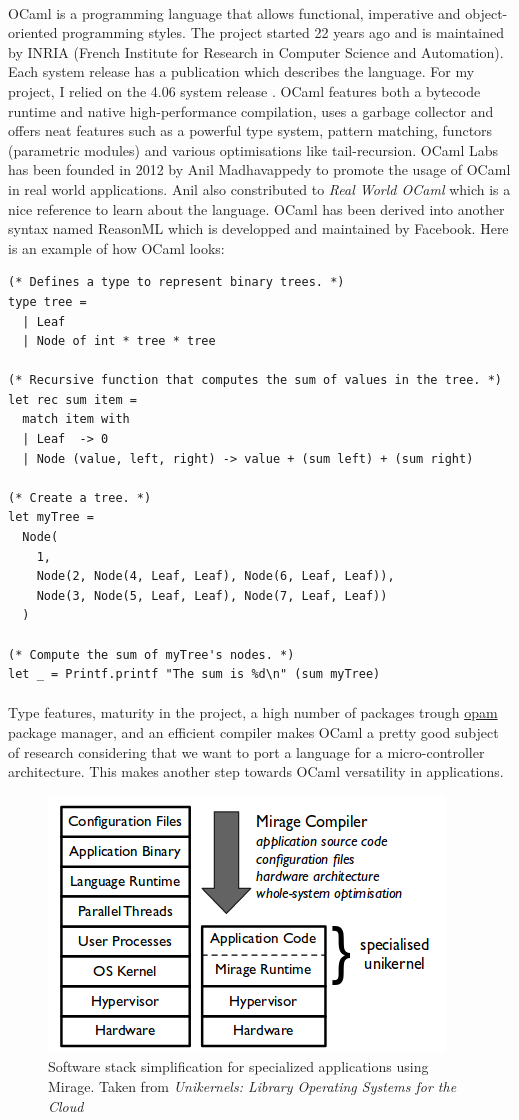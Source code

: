 \documentclass[a4paper]{article}
\begin{document}
\paragraph{}
OCaml is a programming language that allows functional, imperative and object-oriented programming styles. The project started 22 years ago and is maintained by 
INRIA (French Institute for Research in Computer Science and Automation). Each system release has a publication which describes the language. For my project, I 
relied on the 4.06 system release \cite{leroy2017ocaml}. OCaml features both a bytecode runtime and native high-performance compilation, uses a garbage 
collector and offers neat features such as a powerful type system, pattern matching, functors (parametric modules) and various optimisations like tail-recursion. 
OCaml Labs has been founded in 2012 by Anil Madhavappedy to promote the usage of OCaml in real world applications. Anil also constributed to \textit{Real World OCaml} 
\cite{minsky2013real} which is a nice reference to learn about the language. OCaml has been derived into another syntax named ReasonML which is developped and 
maintained by Facebook. Here is an example of how OCaml looks:
\begin{verbatim}
(* Defines a type to represent binary trees. *)
type tree =
  | Leaf
  | Node of int * tree * tree
 
(* Recursive function that computes the sum of values in the tree. *)
let rec sum item =
  match item with
  | Leaf  -> 0
  | Node (value, left, right) -> value + (sum left) + (sum right)
  
(* Create a tree. *)
let myTree =
  Node(
    1,
    Node(2, Node(4, Leaf, Leaf), Node(6, Leaf, Leaf)),
    Node(3, Node(5, Leaf, Leaf), Node(7, Leaf, Leaf))
  )
 
(* Compute the sum of myTree's nodes. *)
let _ = Printf.printf "The sum is %d\n" (sum myTree)
\end{verbatim}
\paragraph{}
Type features, maturity in the project, a high number of packages trough \href{https://opam.ocaml.org/}{opam} package manager, and an efficient compiler makes OCaml a pretty good subject 
of research considering that we want to port a language for a micro-controller architecture. This makes another step towards OCaml versatility in applications.
\begin{figure}
	\includegraphics[width=0.4\columnwidth]{unikernel.png}
    \caption{Software stack simplification for specialized applications using Mirage. Taken from \textit{Unikernels: Library Operating Systems for the Cloud}}
\end{figure}
\end{document}
